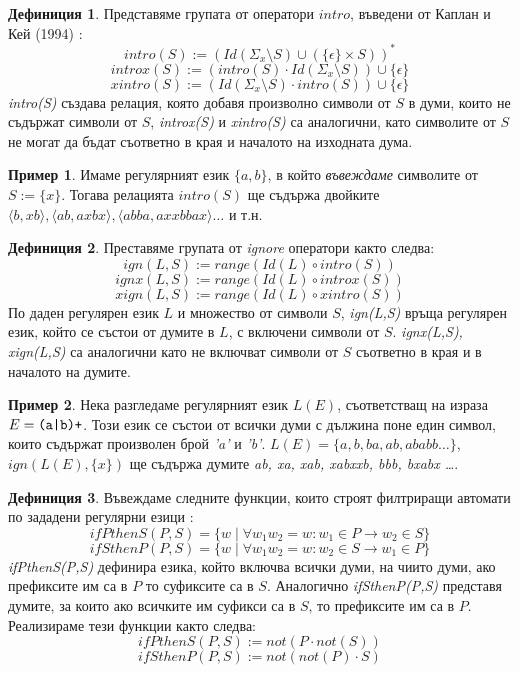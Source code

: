 \documentclass[12pt, oneside]{article}
\theoremstyle{definition}
\newtheorem{definition}{Дефиниция}[section]
\newtheorem{example}{Пример}[section]
\begin{document}
\begin{definition}
	Представяме групата от оператори \(intro\), въведени от Каплан и Кей (1994) \cite{Kaplan&Kay:94}:
	\[ intro(S) := (Id(\Sigma_x \setminus S) \cup (\{\epsilon\} \times S))^* \]
	\[ introx(S) := (intro(S) \cdot Id(\Sigma_x \setminus S)) \cup \{\epsilon\} \]
	\[ xintro(S) := (Id(\Sigma_x \setminus S) \cdot intro(S)) \cup \{\epsilon\} \]
	\emph{intro(S)} създава релация, която добавя произволно символи от \(S\) в думи, които не съдържат символи от \(S\), \emph{introx(S)} и \emph{xintro(S)} са аналогични, като символите от \(S\) не могат да бъдат съответно в края и началото на изходната дума.
\end{definition}

\begin{example}
	Имаме регулярният език \( \{a,b\} \), в който \emph{въвеждаме} символите от \(S := \{ x \}\). Тогава релацията \(intro(S)\) ще съдържа двойките \( \langle b, xb \rangle, \langle ab, axbx \rangle, \langle abba, axxbbax \rangle \dots \) и т.н.
\end{example}

\begin{definition}
	Преставяме групата от \emph{ignore} оператори \cite{Kaplan&Kay:94} както следва:
	\[ ign(L,S) := range(Id(L) \circ intro(S)) \]
	\[ ignx(L,S) := range(Id(L) \circ introx(S)) \]
	\[ xign(L,S) := range(Id(L) \circ xintro(S)) \]
	По даден регулярен език \(L\) и множество от символи \(S\), \emph{ign(L,S)} връща регулярен език, който се състои от думите в \(L\), с включени символи от \(S\). \emph{ignx(L,S), xign(L,S)} са аналогични като не включват символи от \(S\) съответно в края и в началото на думите.	
\end{definition}

\begin{example}
	Нека разгледаме регулярният език \(L(E)\), съответстващ на израза \( E = \verb/(a|b)+/ \). Този език се състои от всички думи с дължина поне един символ, които съдържат произволен брой \emph{'a'} и \emph{'b'}. \( L(E) = \{a, b, ba, ab, ababb \dots \} \), \( ign(L(E), \{x\}) \) ще съдържа думите \emph{ab, xa, xab, xabxxb, bbb, bxabx \dots }.
\end{example}

\begin{definition}\label{def:defIfPThenS}
	Въвеждаме следните функции, които строят филтриращи автомати по зададени регулярни езици \cite{Kaplan&Kay:94}:
	\[ ifPthenS(P,S) = \{ w \mid \forall w_1w_2 = w: w_1 \in P \to w_2 \in S \} \]
	\[ ifSthenP(P,S) = \{ w \mid \forall w_1w_2 = w: w_2 \in S \to w_1 \in P \} \]
	\emph{ifPthenS(P,S)} дефинира езика, който включва всички думи, на чиито думи, ако префиксите им са в \(P\) то суфиксите са в \(S\). Аналогично \emph{ifSthenP(P,S)} представя думите, за които ако всичките им суфикси са в \(S\), то префиксите им са в \(P\). Реализираме тези функции както следва:
	\[ ifPthenS(P,S) := not(P \cdot not(S)) \]
	\[ ifSthenP(P,S) := not(not(P) \cdot S) \]	
\end{definition}
\end{document}
